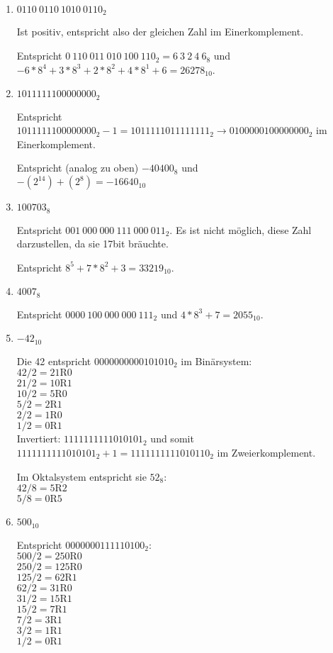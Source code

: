 \begin{enumerate}
\item $0110\ 0110\ 1010\ 0110_2$

Ist positiv, entspricht also der gleichen Zahl im Einerkomplement.

Entspricht $0\ 110\ 011\ 010\ 100\ 110_2 = 6\ 3\ 2\ 4\ 6_8$ und\\
$-6*8^4+3*8^3+2*8^2+4*8^1+6 = 26278_{10}$.

\item $1011111100000000_2$

Entspricht $1011111100000000_2 - 1 = 1011 1110 1111 1111_2 \rightarrow 0100 0001 0000 0000_2$ im Einerkomplement.

Entspricht (analog zu oben) $-40400_8$ und\\
$-(2^14) + (2^8) = -16640_{10}$

\item $100703_8$

Entspricht $001\ 000\ 000\ 111\ 000\ 011_2$. Es ist nicht möglich, diese Zahl darzustellen, da sie 17bit bräuchte.

Entspricht $8^5 + 7*8^2+3 = 33219_{10}$.

\item $4007_8$

Entspricht $0000\ 100\ 000\ 000\ 111_2$ und $4*8^3 + 7 = 2055_{10}$.

\item $-42_{10}$

Die 42 entspricht $0000 0000 0010 1010_2$ im Binärsystem:\\
$42 / 2 = 21 \textrm{R} 0$\\
$21 / 2 = 10 \textrm{R} 1$\\
$10 / 2 = 5 \textrm{R} 0$\\
$5 / 2 = 2 \textrm{R} 1$\\
$2 / 2 = 1 \textrm{R} 0$\\
$1 / 2 = 0 \textrm{R} 1$\\
Invertiert: $1111 1111 1101 0101_2$ und somit $1111 1111 1101 0101_2 + 1 = 1111 1111 1101 0110_2$ im Zweierkomplement.

Im Oktalsystem entspricht sie $52_8$:\\
$42 / 8 = 5 \textrm{R} 2$\\
$5 / 8 = 0 \textrm{R} 5$

\item $500_{10}$

Entspricht $0000 0001 1111 0100_2$:\\
$500 / 2 = 250 \textrm{R} 0$\\
$250 / 2 = 125 \textrm{R} 0$\\
$125 / 2 = 62 \textrm{R} 1$\\
$62 / 2 = 31 \textrm{R} 0$\\
$31 / 2 = 15 \textrm{R} 1$\\
$15 / 2 = 7 \textrm{R} 1$\\
$7 / 2 = 3 \textrm{R} 1$\\
$3 / 2 = 1 \textrm{R} 1$\\
$1 / 2 = 0 \textrm{R} 1$


\end{enumerate}
